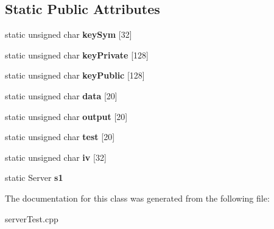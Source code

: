 \subsection*{Static Public Attributes}
\begin{DoxyCompactItemize}
\item 
\hypertarget{class_test_crypto_client_a042fc508021a09b59ea0d4839f86cbbf}{static unsigned char {\bfseries key\-Sym} \mbox{[}32\mbox{]}}\label{class_test_crypto_client_a042fc508021a09b59ea0d4839f86cbbf}

\item 
\hypertarget{class_test_crypto_client_a2e9b16de041af25e60c772732f108b96}{static unsigned char {\bfseries key\-Private} \mbox{[}128\mbox{]}}\label{class_test_crypto_client_a2e9b16de041af25e60c772732f108b96}

\item 
\hypertarget{class_test_crypto_client_a13f891f4bd41c0a5bcbbf9db9baea952}{static unsigned char {\bfseries key\-Public} \mbox{[}128\mbox{]}}\label{class_test_crypto_client_a13f891f4bd41c0a5bcbbf9db9baea952}

\item 
\hypertarget{class_test_crypto_client_a9fa92d264295391d10d1fe9ece1c8c5d}{static unsigned char {\bfseries data} \mbox{[}20\mbox{]}}\label{class_test_crypto_client_a9fa92d264295391d10d1fe9ece1c8c5d}

\item 
\hypertarget{class_test_crypto_client_a8f069ac9f6576f20f65f45d526e9af61}{static unsigned char {\bfseries output} \mbox{[}20\mbox{]}}\label{class_test_crypto_client_a8f069ac9f6576f20f65f45d526e9af61}

\item 
\hypertarget{class_test_crypto_client_a299812b853f8c099568546bde17a3c64}{static unsigned char {\bfseries test} \mbox{[}20\mbox{]}}\label{class_test_crypto_client_a299812b853f8c099568546bde17a3c64}

\item 
\hypertarget{class_test_crypto_client_ae9eaf57221a1656db911bf9e2d28be35}{static unsigned char {\bfseries iv} \mbox{[}32\mbox{]}}\label{class_test_crypto_client_ae9eaf57221a1656db911bf9e2d28be35}

\item 
\hypertarget{class_test_crypto_client_a4dd20a035a66542b7ffac14943f86f4c}{static Server {\bfseries s1}}\label{class_test_crypto_client_a4dd20a035a66542b7ffac14943f86f4c}

\end{DoxyCompactItemize}


The documentation for this class was generated from the following file\-:\begin{DoxyCompactItemize}
\item 
server\-Test.\-cpp\end{DoxyCompactItemize}
